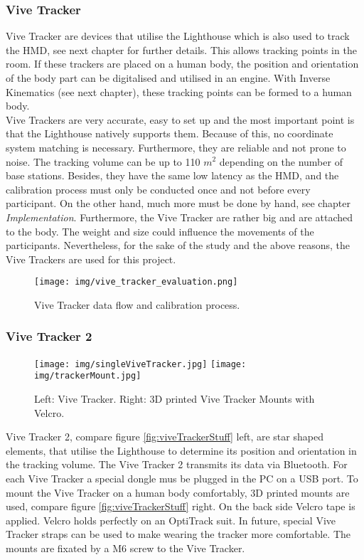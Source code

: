 \subsubsection{Vive Tracker}
Vive Tracker are devices that utilise the Lighthouse which is also used to track the HMD, see next chapter for further details. This allows tracking points in the room. If these trackers are placed on a human body, the position and orientation of the body part can be digitalised and utilised in an engine. With Inverse Kinematics (see next chapter), these tracking points can be formed to a human body.\\
Vive Trackers are very accurate, easy to set up and the most important point is that the Lighthouse natively supports them. Because of this, no coordinate system matching is necessary. Furthermore, they are reliable and not prone to noise. The tracking volume can be up to 110 $m^2$ depending on the number of base stations. Besides, they have the same low latency as the HMD, and the calibration process must only be conducted once and not before every participant. On the other hand, much more must be done by hand, see chapter \textit{Implementation}. Furthermore, the Vive Tracker are rather big and are attached to the body. The weight and size could influence the movements of the participants. Nevertheless, for the sake of the study and the above reasons, the Vive Trackers are used for this project.
\begin{figure}
	\centering
	\texttt{[image: img/vive\_tracker\_evaluation.png]}
	\caption{Vive Tracker data flow and calibration process.}
	\label{fig:viveTrackerCalibration}
\end{figure}

\subsubsection{Vive Tracker 2}
\begin{figure}
	\centering
	\texttt{[image: img/singleViveTracker.jpg]}
	\texttt{[image: img/trackerMount.jpg]}
	\caption{Left: Vive Tracker. Right: 3D printed Vive Tracker Mounts with Velcro.}
	\label{fig:viveTrackerStuff}
	\label{fig:singleViveTracker}
\end{figure}
Vive Tracker 2, compare figure \ref{fig:viveTrackerStuff} left, are star shaped elements, that utilise the Lighthouse to determine its position and orientation in the tracking volume. The Vive Tracker 2 transmits its data via Bluetooth. For each Vive Tracker a special dongle mus be plugged in the PC on a USB port. To mount the Vive Tracker on a human body comfortably, 3D printed mounts are used, compare figure \ref{fig:viveTrackerStuff} right. On the back side Velcro tape is applied. Velcro holds perfectly on an OptiTrack suit. In future, special Vive Tracker straps can be used to make wearing the tracker more comfortable. The mounts are fixated by a M6 screw to the Vive Tracker.

